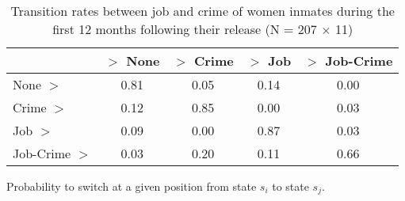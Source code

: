 \begin{table}[htp]
\footnotesize
\setlength{\tabcolsep}{10pt}
\renewcommand{\arraystretch}{1.3}
\begin{threeparttable}
\centering
\caption{Transition rates between job and crime of women inmates \newline
    during the first 12 months following their release (N = 207 $\times$ 11)} 
\label{tab:transition_rates_anyjob_crime}
\begin{tabular}{lcccc}
  \hline
 & $>$ None & $>$ Crime & $>$ Job & $>$ Job-Crime \\ 
  \hline
None $>$ & 0.81 & 0.05 & 0.14 & 0.00 \\ 
  Crime $>$ & 0.12 & 0.85 & 0.00 & 0.03 \\ 
  Job $>$ & 0.09 & 0.00 & 0.87 & 0.03 \\ 
  Job-Crime $>$ & 0.03 & 0.20 & 0.11 & 0.66 \\ 
   \hline
\end{tabular}
\begin{tablenotes}
\scriptsize
\item Probability to switch at a given position from state $s_i$ to state $s_j$.
\end{tablenotes}
\end{threeparttable}
\end{table}
